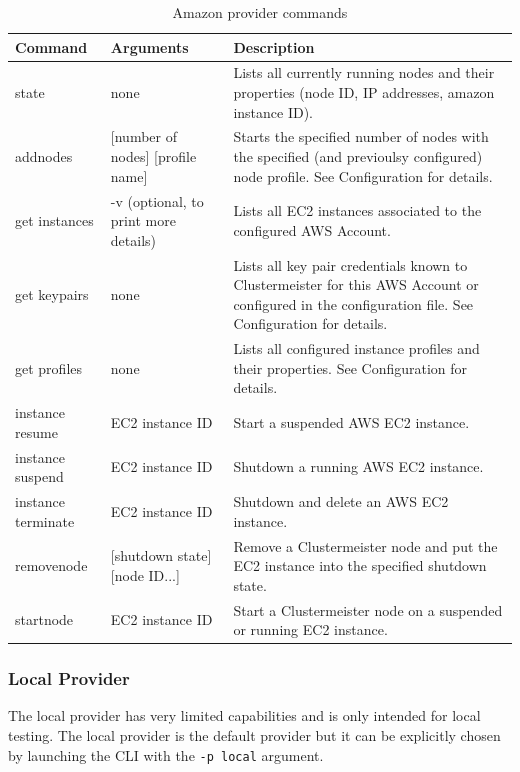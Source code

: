 \documentclass{article}
\begin{document}
\begin{table}[h]
\centering
\begin{tabular}{|l| p{3cm} | p{6cm}|}
\hline
\textbf{Command} & \textbf{Arguments} & \textbf{Description} \\ \hline
state & none & Lists all currently running nodes and their properties (node ID, IP addresses, amazon instance ID). \\ \hline
addnodes & [number of nodes] [profile name] & Starts the specified number of nodes with the specified (and previoulsy configured) node profile. See Configuration for details. \\ \hline
get instances & -v (optional, to print more details) & Lists all EC2 instances associated to the configured AWS Account. \\ \hline
get keypairs & none & Lists all key pair credentials known to Clustermeister for this AWS Account or configured in the configuration file. See Configuration for details. \\ \hline
get profiles & none & Lists all configured instance profiles and their properties. See Configuration for details. \\ \hline
instance resume & EC2 instance ID & Start a suspended AWS EC2 instance. \\ \hline
instance suspend & EC2 instance ID & Shutdown a running AWS EC2 instance. \\ \hline
instance terminate & EC2 instance ID & Shutdown and delete an AWS EC2 instance. \\ \hline
removenode & [shutdown state] [node ID...] & Remove a Clustermeister node and put the EC2 instance into the specified shutdown state. \\ \hline
startnode & EC2 instance ID & Start a Clustermeister node on a suspended or running EC2 instance. \\ \hline
\end{tabular}
\caption{Amazon provider commands}
\label{tab:amazonprovider}
\end{table}


\subsubsection{Local Provider}

The local provider has very limited capabilities and is only intended for local testing. The local provider is the default provider but it can be explicitly chosen by launching the CLI with the \texttt{-p local} argument.
\end{document}
